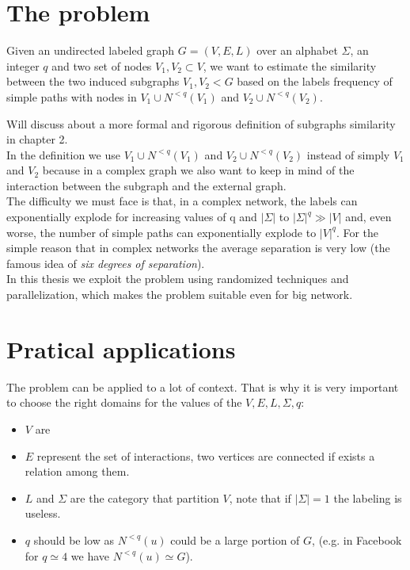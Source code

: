 \section{The problem}

\begin{problema}
Given an undirected labeled graph $G=(V,E,L)$ over an alphabet $\Sigma$, an integer $q$
and two set of nodes $V_{1}, V_{2} \subset V$, we want to estimate the similarity between the two induced subgraphs $V_{1}, V_{2} < G$ based on the labels frequency of simple paths with nodes in $V_{1} \cup N^{<q}(V_{1})$ and $V_{2} \cup N^{<q}(V_{2})$.

\end{problema}

Will discuss about a more formal and rigorous definition of subgraphs similarity in chapter 2.\\

In the definition we use $V_{1} \cup N^{<q}(V_{1})$ and $V_{2} \cup N^{<q}(V_{2})$ instead of simply $V_{1}$ and $V_{2}$ because in a complex graph we also want to keep in mind of the interaction between the subgraph and the external graph.\\

The difficulty we must face is that, in a complex network, the labels can exponentially explode for increasing values of q and $|\Sigma|$ to $|\Sigma|^{q} \gg |V|$ and, even worse, the number of simple paths can exponentially explode to $|V|^{q}$. For the simple reason that in complex networks the average separation is very low (the famous idea of \textit{six degrees of separation}).\\

In this thesis we exploit the problem using randomized techniques and parallelization, which makes the problem suitable even for big network. 

\section{Pratical applications}

The problem can be applied to a lot of context.
That is why it is very important to choose the right domains for the values of the $V, E, L, \Sigma, q$:
\begin{itemize}
\item $V$ are 
\item $E$ represent the set of interactions, two vertices are connected if exists a relation among them.
\item $L$ and $\Sigma$ are the category that partition $V$, note that if $|\Sigma| = 1$ the labeling is useless.
\item $q$ should be low as $N^{<q}(u)$ could be a large portion of $G$, (e.g. in Facebook for $q \simeq 4$ we have $N^{<q}(u) \simeq G$).
\end{itemize}

